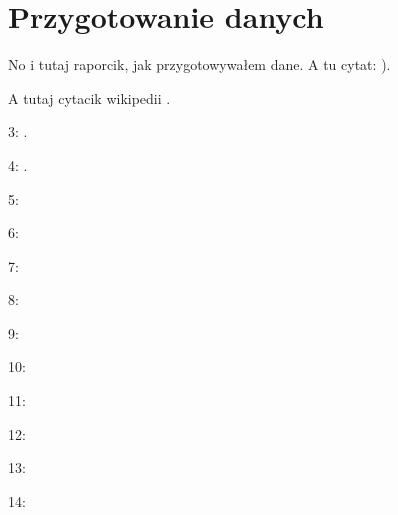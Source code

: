 %		
%
%
%


\chapter{Przygotowanie danych}
\label{cha:przyg.danych}

No i tutaj raporcik, jak przygotowywałem dane. A tu cytat: \cite{Santos09}).

A tutaj cytacik wikipedii \cite{wiki:klas.stat}.

3: \cite{Olson85}.

4: \cite{ferrite.meter}.

5: \cite{Babu13}

6: \cite{Saluja15}

7: \cite{Vitek03.I}

8: \cite{Vitek03.II}

9: \cite{Vasudevan13}

10: \cite{Bhadeshia07}

11: \cite{Badmos13}

12: \cite{Nieves09}

13: \cite{Yang16}

14: \cite{Yoseba08}

